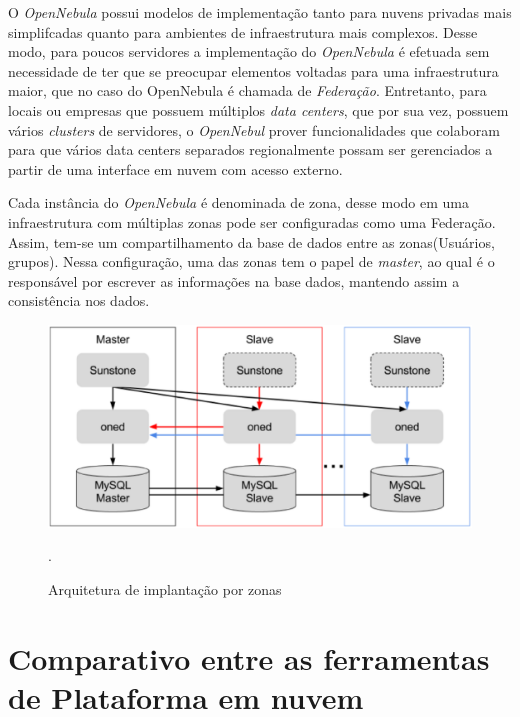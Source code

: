 O \textit{OpenNebula} possui modelos de implementação tanto para nuvens privadas mais simplifcadas quanto para ambientes de infraestrutura mais complexos. Desse modo, para poucos servidores a implementação do \textit{OpenNebula} é efetuada sem necessidade de ter que se preocupar elementos voltadas para uma infraestrutura maior, que no caso do OpenNebula é chamada de \textit{Federação}. Entretanto, para locais ou empresas que possuem múltiplos \textit{data centers}, que por sua vez, possuem vários \textit{clusters} de servidores, o \textit{OpenNebul} prover funcionalidades que colaboram para que vários data centers separados regionalmente possam ser gerenciados a partir de uma interface em nuvem com acesso externo. 

Cada instância do \textit{OpenNebula} é denominada de zona, desse modo em uma infraestrutura com múltiplas zonas pode ser configuradas como uma Federação. Assim, tem-se um compartilhamento da base de dados entre as zonas(Usuários, grupos). Nessa configuração, uma das zonas tem o papel de \textit{master}, ao qual é o responsável por escrever as informações na base dados, mantendo assim a consistência nos dados\cite{opennebula}.

\begin{figure}[!htb]
\centering
\includegraphics [keepaspectratio=true,scale=0.50]{figuras/opennebula_zone.eps}
\caption{Arquitetura de implantação por zonas}
\cite{opennebula}.
\label{opennebulafederation}
\end{figure}

\section{Comparativo entre as ferramentas de Plataforma em nuvem}

